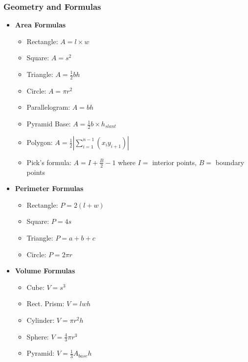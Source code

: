 \subsubsection{Geometry and Formulas}
\vspace{2.5mm}
\begin{itemize}
    \item \textbf{Area Formulas}
          \begin{itemize}
              \item Rectangle: $A = l \times w$
              \item Square: $A = s^2$
              \item Triangle: $A = \frac{1}{2}bh$
              \item Circle: $A = \pi r^2$
              \item Parallelogram: $A = bh$
              \item Pyramid Base: $A = \frac{1}{2}b \times h_{slant}$
              \item Polygon: $A = \frac{1}{2}|\sum_{i=1}^{n-1}(x_iy_{i+1})|$
              \item Pick's formula: $A = I + \frac{B}{2} - 1$ where $I=$ interior points, $B=$
                    boundary points
          \end{itemize}

    \item \textbf{Perimeter Formulas}
          \begin{itemize}
              \item Rectangle: $P = 2(l + w)$
              \item Square: $P = 4s$
              \item Triangle: $P = a + b + c$
              \item Circle: $P = 2\pi r$
          \end{itemize}

    \item \textbf{Volume Formulas}
          \begin{itemize}
              \item Cube: $V = s^3$
              \item Rect. Prism: $V = lwh$
              \item Cylinder: $V = \pi r^2h$
              \item Sphere: $V = \frac{4}{3}\pi r^3$
              \item Pyramid: $V = \frac{1}{3}A_{base}h$
          \end{itemize}


\end{itemize}
